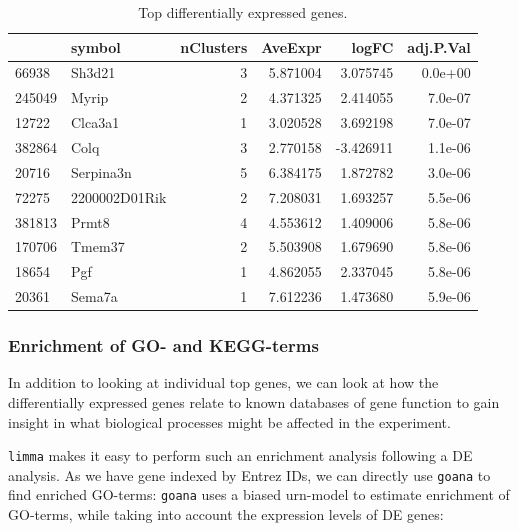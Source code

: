 \documentclass[9pt,a4paper,]{extarticle}
\newenvironment{Shaded}{\begin{snugshade}}{\end{snugshade}}
\newcommand{\KeywordTok}[1]{\textcolor[rgb]{0.13,0.29,0.53}{\textbf{{#1}}}}
\newcommand{\DataTypeTok}[1]{\textcolor[rgb]{0.13,0.29,0.53}{{#1}}}
\newcommand{\DecValTok}[1]{\textcolor[rgb]{0.00,0.00,0.81}{{#1}}}
\newcommand{\StringTok}[1]{\textcolor[rgb]{0.31,0.60,0.02}{{#1}}}
\newcommand{\CommentTok}[1]{\textcolor[rgb]{0.56,0.35,0.01}{\textit{{#1}}}}
\newcommand{\OtherTok}[1]{\textcolor[rgb]{0.56,0.35,0.01}{{#1}}}
\newcommand{\NormalTok}[1]{{#1}}
\begin{document}
\begin{table}[t]

\caption{\label{tab:limmaTop}Top differentially expressed genes.}
\centering
\begin{tabular}{l|l|r|r|r|r}
\hline
  & symbol & nClusters & AveExpr & logFC & adj.P.Val\\
\hline
66938 & Sh3d21 & 3 & 5.871004 & 3.075745 & 0.0e+00\\
\hline
245049 & Myrip & 2 & 4.371325 & 2.414055 & 7.0e-07\\
\hline
12722 & Clca3a1 & 1 & 3.020528 & 3.692198 & 7.0e-07\\
\hline
382864 & Colq & 3 & 2.770158 & -3.426911 & 1.1e-06\\
\hline
20716 & Serpina3n & 5 & 6.384175 & 1.872782 & 3.0e-06\\
\hline
72275 & 2200002D01Rik & 2 & 7.208031 & 1.693257 & 5.5e-06\\
\hline
381813 & Prmt8 & 4 & 4.553612 & 1.409006 & 5.8e-06\\
\hline
170706 & Tmem37 & 2 & 5.503908 & 1.679690 & 5.8e-06\\
\hline
18654 & Pgf & 1 & 4.862055 & 2.337045 & 5.8e-06\\
\hline
20361 & Sema7a & 1 & 7.612236 & 1.473680 & 5.9e-06\\
\hline
\end{tabular}
\end{table}

\subsubsection{Enrichment of GO- and KEGG-terms}\label{enrichment-of-go--and-kegg-terms}

In addition to looking at individual top genes, we can look at how the differentially expressed genes relate to known databases of gene function to gain insight in what biological processes might be affected in the experiment.

\texttt{limma} makes it easy to perform such an enrichment analysis following a DE analysis. As we have gene indexed by Entrez IDs, we can directly use \texttt{goana} to find enriched GO-terms: \texttt{goana} uses a biased urn-model to estimate enrichment of GO-terms, while taking into account the expression levels of DE genes:

\begin{Shaded}
\end{Shaded}
\end{document}
